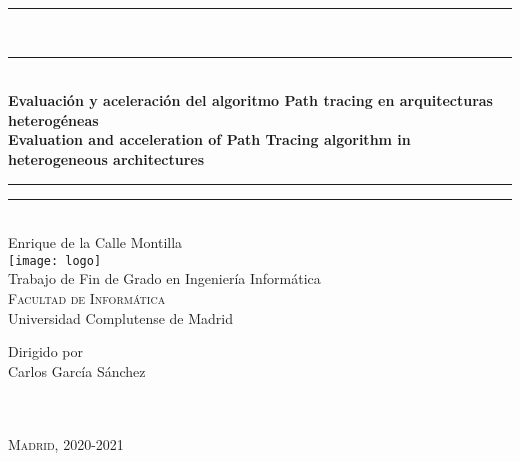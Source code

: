 

\begin{center}
    \rule[0.5ex]{\linewidth}{2pt}\vspace*{-\baselineskip}\vspace*{3.2pt}\\
    \rule[0.5ex]{\linewidth}{2pt}\\
    [2mm]
    {\textbf{\LARGE{Evaluación y aceleración del algoritmo Path tracing en arquitecturas heterogéneas}} }\\[3mm]
	\vspace{6.5mm}
    {\textbf{\large{Evaluation and acceleration of Path Tracing algorithm in heterogeneous architectures}} }\\[3mm]
    \rule[0.5ex]{\linewidth}{1pt}\vspace*{-\baselineskip}\vspace{3.2pt}
    \rule[0.5ex]{\linewidth}{2pt}\\
    \vspace{6.5mm}
    {\large Enrique de la Calle Montilla}
    \vspace{6.5mm}
    {\large\textsc{}}\\ %
    \vspace{5mm}
    \texttt{[image: logo]}\\ %
    \vspace{6mm}
    {\large Trabajo de Fin de Grado en Ingeniería Informática\\   
    \textsc{Facultad de Informática}}\\
	\large Universidad Complutense de Madrid\\   
    \vspace{11mm}
    \begin{minipage}{10cm}
    \begin{center}
	Dirigido por\\
    Carlos García Sánchez\\
      \textbf{}\\
      \vspace{2mm}
    \end{center}
    \vspace{4mm}
    
    \end{minipage}\\
    \vspace{4mm}
    {\large\textsc{Madrid, 2020-2021}} %
    \vspace{12mm}
\end{center}
